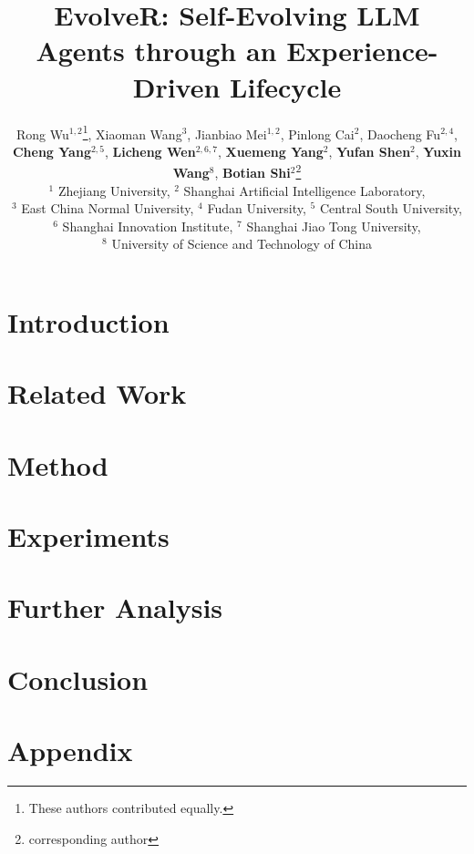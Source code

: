 \documentclass{article} %
\title{EvolveR: Self-Evolving LLM Agents through an Experience-Driven Lifecycle}
\author{
Rong Wu$^{1,2}$\thanks{These authors contributed equally.}, Xiaoman Wang$^{3}$\footnotemark[1], Jianbiao Mei$^{1,2}$, Pinlong Cai$^{2}$, Daocheng Fu$^{2,4}$, \\ \textbf{Cheng Yang}$^{2,5}$, 
\textbf{Licheng Wen}$^{2,6,7}$, \textbf{Xuemeng Yang}$^{2}$, \textbf{Yufan Shen}$^{2}$, \textbf{Yuxin Wang}$^{8}$, \textbf{Botian Shi}$^{2}$\thanks{corresponding author} \vspace{7pt} \\
$^{1}$ Zhejiang University, $^{2}$ Shanghai Artificial Intelligence Laboratory, \\ $^{3}$ East China Normal University, $^{4}$ Fudan University, $^{5}$ Central South University, \\ $^{6}$ Shanghai Innovation Institute,
$^{7}$ Shanghai Jiao Tong University,  \\ $^{8}$ University of Science and Technology of China
}
\begin{document}
\maketitle

\begin{abstract}

\end{abstract}

\section{Introduction}


\section{Related Work}


\section{Method}


\section{Experiments}


\section{Further Analysis}


\section{Conclusion}




\newpage

% 


\newpage
\appendix
\section{Appendix}

\end{document}
